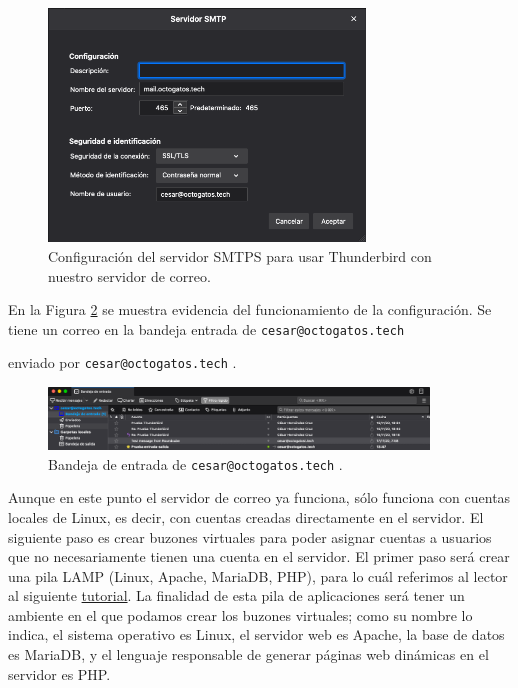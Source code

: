 \documentclass{article}
\newcommand{\ttt}[1]{%
\texttt{#1}%
}
\begin{document}
\begin{figure}[H]
  \centering
  \includegraphics[width=0.75\textwidth]{email/tbirdout}
  \caption{Configuraci\'on del servidor SMTPS para
           usar Thunderbird con nuestro servidor de correo.}
  \label{fig:email-tbirdout}
\end{figure}

En la Figura \ref{fig:email-tbird} se muestra evidencia
del funcionamiento de la configuraci\'on.   Se tiene un
correo en la bandeja entrada de \ttt{cesar@octogatos.tech}
enviado por \ttt{cesar@octogatos.tech}.

\begin{figure}[H]
  \centering
  \includegraphics[width=0.9\textwidth]{email/tbird}
  \caption{Bandeja de entrada de \ttt{cesar@octogatos.tech}.}
  \label{fig:email-tbird}
\end{figure}

Aunque en este punto el servidor de correo ya funciona,
s\'olo funciona con cuentas locales de Linux, es decir,
con cuentas creadas directamente en el servidor.   El
siguiente paso es crear buzones virtuales para poder
asignar cuentas a usuarios que no necesariamente tienen
una cuenta en el servidor.    El primer paso ser\'a
crear una pila LAMP (Linux, Apache, MariaDB, PHP),
para lo cu\'al referimos al lector al siguiente
\href{https://www.linuxbabe.com/ubuntu/install-lamp-stack-ubuntu-20-04-server-desktop}{tutorial}.   La finalidad
de esta pila de aplicaciones ser\'a tener un ambiente
en el que podamos crear los buzones virtuales; como
su nombre lo indica, el sistema operativo es Linux,
el servidor web es Apache, la base de datos es
MariaDB, y el lenguaje responsable de generar p\'aginas
web din\'amicas en el servidor es PHP.
\end{document}
